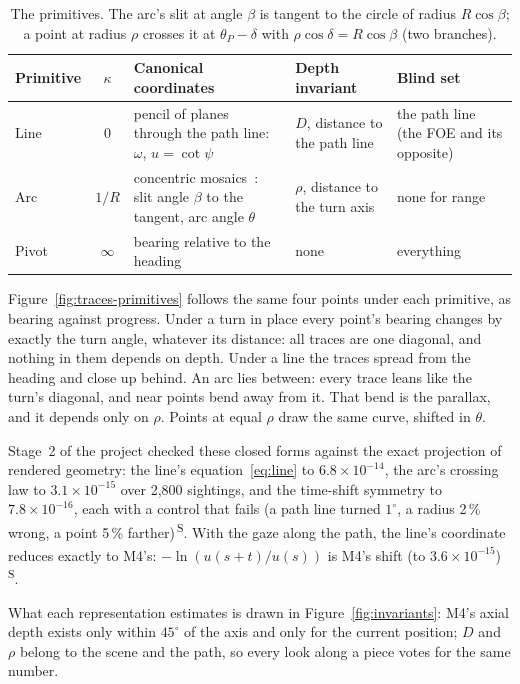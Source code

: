 \documentclass[11pt,a4paper]{article}
\newcommand{\src}[1]{\textsuperscript{\,#1}}
\newcommand{\SB}{\src{S}}   %
\begin{document}
\begin{table}[h]
\centering\small
\begin{tabularx}{\linewidth}{@{}l c L L L@{}}
\toprule
Primitive & $\kappa$ & Canonical coordinates & Depth invariant & Blind set \\
\midrule
Line & 0 & pencil of planes through the path line: $\omega$, $u=\cot\psi$ & $D$, distance to the path line & the path
line (the FOE and its opposite)\\
Arc & $1/R$ & concentric mosaics~\cite{shum}: slit angle $\beta$ to the tangent, arc angle $\theta$ & $\rho$, distance to the
turn axis & none for range\\
Pivot & $\infty$ & bearing relative to the heading & none & everything\\
\bottomrule
\end{tabularx}
\caption{The primitives. The arc's slit at angle $\beta$ is tangent to the circle of radius $R\cos\beta$; a point at radius
$\rho$ crosses it at $\theta_P-\delta$ with $\rho\cos\delta = R\cos\beta$ (two branches).}\label{tab:primitives}
\end{table}

Figure~\ref{fig:traces-primitives} follows the same four points under each primitive, as bearing against progress. Under
a turn in place every point's bearing changes by exactly the turn angle, whatever its distance: all traces are one
diagonal, and nothing in them depends on depth. Under a line the traces spread from the heading and close up behind. An
arc lies between: every trace leans like the turn's diagonal, and near points bend away from it. That bend is the
parallax, and it depends only on $\rho$. Points at equal $\rho$ draw the same curve, shifted in $\theta$.

Stage~2 of the project checked these closed forms against the exact projection of rendered geometry: the line's
equation~\eqref{eq:line} to $6.8\times10^{-14}$, the arc's crossing law to $3.1\times10^{-15}$ over 2{,}800 sightings, and
the time-shift symmetry to $7.8\times10^{-16}$, each with a control that fails (a path line turned $1^\circ$, a radius
2\,\% wrong, a point 5\,\% farther)\SB. With the gaze along the path, the line's coordinate reduces exactly to M4's:
$-\ln(u(s+t)/u(s))$ is M4's shift (to $3.6\times10^{-15}$)\SB.

What each representation estimates is drawn in Figure~\ref{fig:invariants}: M4's axial depth exists only within $45^\circ$
of the axis and only for the current position; $D$ and $\rho$ belong to the scene and the path, so every look along a
piece votes for the same number.
\end{document}
